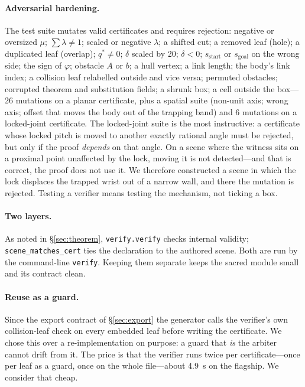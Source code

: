 \documentclass[10pt,twocolumn,letterpaper]{article}
\newcommand{\vphi}{\varphi}
\begin{document}
\paragraph{Adversarial hardening.} The test suite mutates valid certificates and requires rejection: negative or oversized $\mu$; $\sum\lambda\ne1$; scaled or negative $\lambda$; a shifted cut; a removed leaf (hole); a duplicated leaf (overlap); $q^*\ne0$; $\delta$ scaled by 20; $\delta<0$; $s_{\mathrm{start}}$ or $s_{\mathrm{goal}}$ on the wrong side; the sign of $\vphi$; obstacle $A$ or $b$; a hull vertex; a link length; the body's link index; a collision leaf relabelled outside and vice versa; permuted obstacles; corrupted theorem and substitution fields; a shrunk box; a cell outside the box---26 mutations on a planar certificate, plus a spatial suite (non-unit axis; wrong axis; offset that moves the body out of the trapping band) and 6 mutations on a locked-joint certificate. The locked-joint suite is the most instructive: a certificate whose locked pitch is moved to another exactly rational angle must be rejected, but only if the proof \emph{depends} on that angle. On a scene where the witness sits on a proximal point unaffected by the lock, moving it is not detected---and that is correct, the proof does not use it. We therefore constructed a scene in which the lock displaces the trapped wrist out of a narrow wall, and there the mutation is rejected. Testing a verifier means testing the mechanism, not ticking a box.

\paragraph{Two layers.} As noted in \S\ref{sec:theorem}, \texttt{verify.verify} checks internal validity; \texttt{scene\_matches\_cert} ties the declaration to the authored scene. Both are run by the command-line \texttt{verify}. Keeping them separate keeps the sacred module small and its contract clean.

\paragraph{Reuse as a guard.} Since the export contract of \S\ref{sec:export} the generator calls the verifier's own collision-leaf check on every embedded leaf before writing the certificate. We chose this over a re-implementation on purpose: a guard that \emph{is} the arbiter cannot drift from it. The price is that the verifier runs twice per certificate---once per leaf as a guard, once on the whole file---about 4.9~s on the flagship. We consider that cheap.
\end{document}
